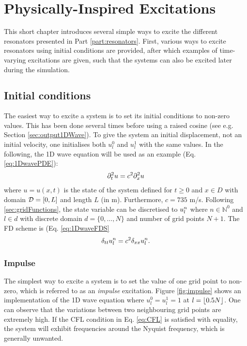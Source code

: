 \chapter{Physically-Inspired Excitations}\label{ch:physInspExcitations}
This short chapter introduces several simple ways to excite the different resonators presented in Part \ref{part:resonators}. First, various ways to excite resonators using initial conditions are provided, after which examples of time-varying excitations are given, such that the systems can also be excited later during the simulation.

\section{Initial conditions}\label{sec:initConditionsPhysInsp}
The easiest way to excite a system is to set its initial conditions to non-zero values. This has been done several times before using a raised cosine (see e.g. Section \ref{sec:output1DWave}). To give the system an initial displacement, not an initial velocity, one initialises both $u^0_l$ and $u^1_l$ with the same values. In the following, the 1D wave equation will be used as an example (Eq. \eqref{eq:1DwavePDE}):
\begin{equation}
    \partial_t^2 u = c^2 \partial_x^2 u
\end{equation}
where $u=u(x,t)$ is the state of the system defined for $t\geq 0$ and $x\in D$ with domain $\mathcal{D} = [0, L]$ and length $L$ (in m). Furthermore, $c = 735$ m/s. Following \ref{sec:gridFunctions}, the state variable can be discretised to $u_l^n$ where $n\in \mathbb{N}^0$ and $l\in d$ with discrete domain $d = \{0, \hdots, N\}$ and number of grid points $N+1$. The FD scheme is (Eq. \eqref{eq:1DwaveFDS}
\begin{equation}
    \delta_{tt} u_l^n = c^2 \delta_{xx} u_l^n.
\end{equation}

\subsection{Impulse}
The simplest way to excite a system is to set the value of one grid point to non-zero, which is referred to as an \textit{impulse} excitation. Figure \ref{fig:impulse} shows an implementation of the 1D wave equation where $u_l^0 = u_l^1 = 1$ at $l = \floor[0.5 N]$. One can observe that the variations between two neighbouring grid points are extremely high. If the CFL condition in Eq. \eqref{eq:CFL} is satisfied with equality, the system will exhibit frequencies around the Nyquist frequency, which is generally unwanted.

